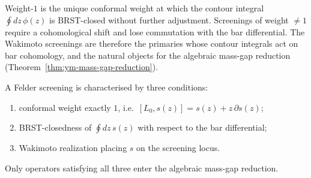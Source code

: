 \begin{remark}
\label{rem:weight-one-brst}
Weight-$1$ is the unique conformal weight at which the contour
integral $\oint dz\,\phi(z)$ is BRST-closed without further
adjustment. Screenings of weight $\neq 1$ require a cohomological
shift and lose commutation with the bar differential. The Wakimoto
screenings are therefore the primaries whose contour integrals act on
bar cohomology, and the natural objects for the algebraic mass-gap
reduction (Theorem~\ref{thm:ym-mass-gap-reduction}).
\end{remark}

\begin{remark}
\label{rem:screenings-first-principles-triple}
A Felder screening is characterised by three conditions:
\begin{enumerate}[label=\textup{(\roman*)}]
\item conformal weight exactly $1$, i.e.\ $[L_0, s(z)] = s(z) + z\,\partial s(z)$;
\item BRST-closedness of $\oint dz\, s(z)$ with respect to the bar differential;
\item Wakimoto realization placing $s$ on the screening locus.
\end{enumerate}
Only operators satisfying all three enter the algebraic mass-gap reduction.
\end{remark}
